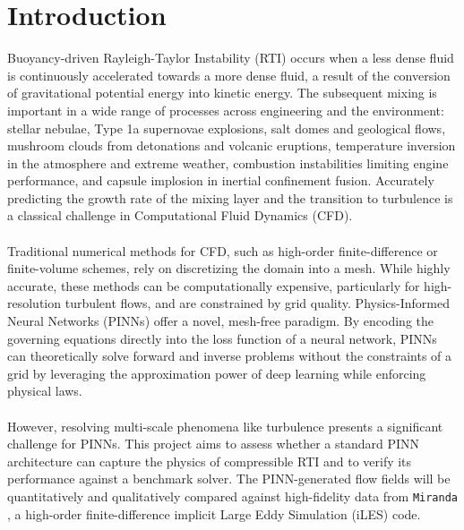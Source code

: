 \documentclass{homework}
\begin{document}
\section{Introduction}
Buoyancy-driven Rayleigh-Taylor Instability (RTI) occurs when a less dense fluid is continuously accelerated towards a more dense fluid, a result of the conversion of gravitational potential energy into kinetic energy. The subsequent mixing is important in a wide range of processes across engineering and the environment: stellar nebulae, Type 1a supernovae explosions, salt domes and geological flows, mushroom clouds from detonations and volcanic eruptions, temperature inversion in the atmosphere and extreme weather, combustion instabilities limiting engine performance, and capsule implosion in inertial confinement fusion. Accurately predicting the growth rate of the mixing layer and the transition to turbulence is a classical challenge in Computational Fluid Dynamics (CFD).
\\ \\
Traditional numerical methods for CFD, such as high-order finite-difference or finite-volume schemes, rely on discretizing the domain into a mesh. While highly accurate, these methods can be computationally expensive, particularly for high-resolution turbulent flows, and are constrained by grid quality. Physics-Informed Neural Networks (PINNs) \cite{Raissi2017_1,Raissi2017_2,Raissi2019,Yadav2025} offer a novel, mesh-free paradigm. By encoding the governing equations directly into the loss function of a neural network, PINNs can theoretically solve forward and inverse problems without the constraints of a grid by leveraging the approximation power of deep learning while enforcing physical laws.
\\ \\
However, resolving multi-scale phenomena like turbulence presents a significant challenge for PINNs. This project aims to assess whether a standard PINN architecture can capture the physics of compressible RTI and to verify its performance against a benchmark solver. The PINN-generated flow fields will be quantitatively and qualitatively compared against high-fidelity data from \texttt{Miranda} \cite{Cook2007,pyrandaCode,Lele1992,Olson2013}, a high-order finite-difference implicit Large Eddy Simulation (iLES) code.
\\ \\
\end{document}
